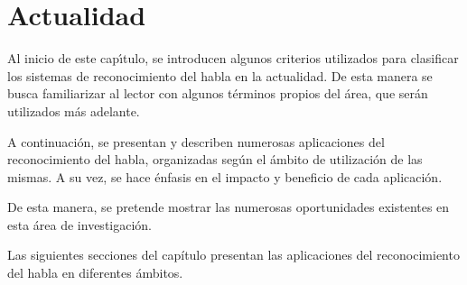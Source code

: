\chapter{Actualidad}
\label{sec:areas-aplicacion}
Al inicio de este cap{\'\i}tulo, se introducen algunos criterios utilizados para clasificar los sistemas
de reconocimiento del habla en la actualidad. De esta manera se busca familiarizar al lector con
algunos t\'erminos propios del \'area, que ser\'an utilizados m\'as adelante.

A continuaci\'on, se presentan y describen numerosas aplicaciones del reconocimiento del habla, 
organizadas seg\'un el \'ambito de utilizaci\'on de las mismas. A su vez, se hace \'enfasis en el impacto 
y beneficio de cada aplicaci\'on.

De esta manera, se pretende mostrar las numerosas oportunidades existentes en esta \'area de investigaci\'on.



Las siguientes secciones del cap\'itulo presentan las aplicaciones del reconocimiento del habla en diferentes
\'ambitos.









